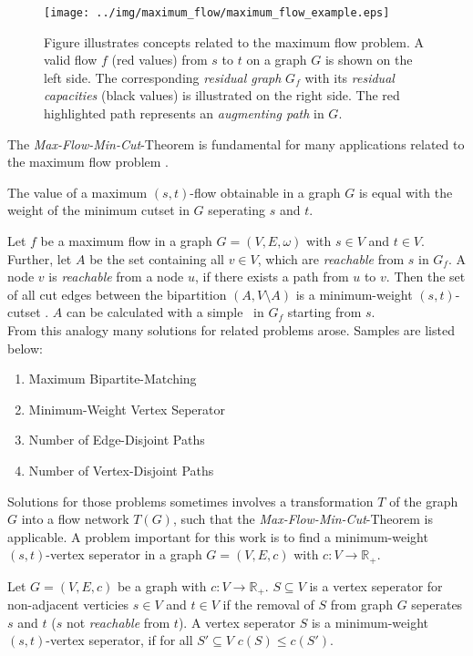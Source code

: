 \begin{figure}
\centering
\texttt{[image: ../img/maximum\_flow/maximum\_flow\_example.eps]}
\caption{Figure illustrates concepts related to the maximum flow problem. A valid flow $f$ 
(red values) from $s$ to $t$ on a graph $G$ is shown on the left side. The corresponding
\emph{residual graph} $G_f$ with its \emph{residual capacities} (black values) 
is illustrated on the right side. The red highlighted path represents an \emph{augmenting path}
in $G$.}
\label{img:maximum_flow_example}
\end{figure}

The \emph{Max-Flow-Min-Cut}-Theorem is fundamental for many applications related to the maximum
flow problem \cite{ford1956maximal}.

\begin{theorem}
The value of a maximum $(s,t)$-flow obtainable in a graph $G$ is equal with the weight
of the minimum cutset in $G$ seperating $s$ and $t$.
\end{theorem}

Let $f$ be a maximum flow in a graph $G = (V,E,\omega)$ with $s \in V$ and $t \in V$. 
Further, let $A$ be the set containing all $v \in V$, which are \emph{reachable} from $s$
in $G_f$. A node $v$ is \emph{reachable} from a node $u$, if there exists a path from $u$
to $v$. Then the set of all cut edges between the bipartition $(A,V\setminus A)$ 
is a minimum-weight $(s,t)$-cutset \cite{ford2015flows}. $A$ can be calculated with a simple \BFS~in $G_f$ starting
from $s$. \\
From this analogy many solutions for related problems arose. Samples are listed below:
\begin{enumerate}
\item Maximum Bipartite-Matching
\item Minimum-Weight Vertex Seperator
\item Number of Edge-Disjoint Paths
\item Number of Vertex-Disjoint Paths
\end{enumerate}
Solutions for those problems sometimes involves a transformation $T$ of the graph $G$
into a flow network $T(G)$, such that the \emph{Max-Flow-Min-Cut}-Theorem is applicable. 
A problem important for this work is to find a minimum-weight $(s,t)$-vertex seperator
in a graph $G = (V,E,c)$ with $c: V \rightarrow \mathbb{R}_+$.

\begin{definition}
Let $G = (V,E,c)$ be a graph with $c: V \rightarrow \mathbb{R}_+$. $S \subseteq V$
is a vertex seperator for non-adjacent verticies $s \in V$ and $t \in V$ if the
removal of $S$ from graph $G$ seperates $s$ and $t$ ($s$ not \emph{reachable} from $t$).
A vertex seperator $S$ is a minimum-weight $(s,t)$-vertex seperator, if for all $S' \subseteq V$
$c(S) \le c(S')$.
\end{definition}

